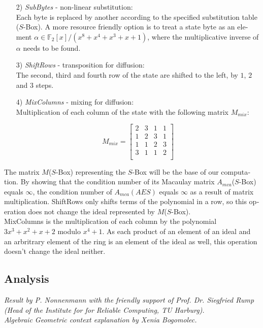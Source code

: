 \documentclass[a4paper,11pt]{article}
\begin{document}
\begin{otherlanguage}{english}
\begin{itemize} [noitemsep, nolistsep]
  \item[2)] \textit{SubBytes} - non-linear substitution: \\
  Each byte is replaced by another according to the specified substitution table ($S$-Box). A more resource friendly option is to treat a state byte as an element $\alpha \in \mathbb{F}_2 [x]/(x^8 + x^4 + x^3 + x + 1)$, where the multiplicative inverse of $\alpha$ needs to be found.
  \vspace{0.1cm}

  \item[3)] \textit{ShiftRows} - transposition for diffusion: \\
  The second, third and fourth row of the state are shifted to the left, by $1$, $2$ and $3$ steps.
  \vspace{0.1cm}

  \item[4)] \textit{MixColumns} - mixing for diffusion: \\
  Multiplication of each column of the state with the following matrix $M_{mix}$:

  $$ 
  	M_{mix} = 
  	\begin{bmatrix}
  		2 & 3 & 1 & 1 \\ 
  	 	1 & 2 & 3 & 1 \\
  	 	1 & 1 & 2 & 3 \\
  	 	3 & 1 & 1 & 2 \\
  	\end{bmatrix}
  $$

\end{itemize} 

\vspace{0.3cm}
\noindent
The matrix $M$($S$-Box) representing the $S$-Box will be the base of our computation. By showing that the condition number of its Macaulay matrix $A_{mca}$($S$-Box) equals $\infty$, the condition number of $A_{mca}(AES)$ equals $\infty$ as a result of matrix multiplication. ShiftRows only shifts terms of the polynomial in a row, so this operation does not change the ideal represented by $M$($S$-Box). \\

\noindent
MixColumns is the multiplication of each column by the polynomial $3x^{3}+x^{2}+x+2$ modulo $x^4+1$. As each product of an element of an ideal and an arbritrary element of the ring is an element of the ideal as well, this operation doesn't change the ideal neither.\\


\subsection{Analysis}
\noindent 
{\small \textit{Result by P. Nonnenmann with the friendly support of Prof. Dr. Siegfried Rump (Head of the Institute for for Reliable Computing, TU Harburg). \\
Algebraic Geometric context explanation by Xenia Bogomolec.}}\\


\end{otherlanguage}
\end{document}
